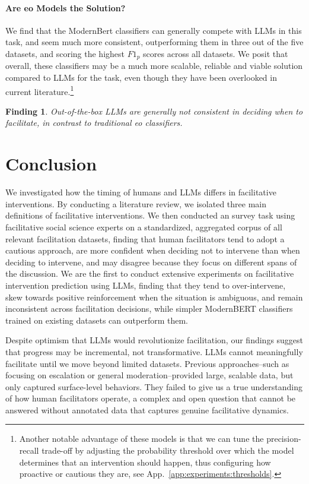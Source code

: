 \documentclass[11pt]{article}
\theoremstyle{definition}
\theoremstyle{plain}
\newtheorem{finding}{Finding}
\begin{document}
\paragraph{Are \ac{eo} Models the Solution?} We find that the ModernBert classifiers can generally compete with LLMs in this task, and seem much more consistent, outperforming them in three out of the five datasets, and scoring the highest $F1_p$ scores across all datasets. We posit that overall, these classifiers may be a much more scalable, reliable and viable solution compared to LLMs for the task, even though they have been overlooked in current literature.\footnote{Another notable advantage of these models is that we can tune the precision-recall trade-off by adjusting the probability threshold over which the model determines that an intervention should happen, thus configuring how proactive or cautious they are, see App.~\ref{app:experiments:thresholds}.}

\begin{finding}
	\label{finding:llms-may-facilitate}
	Out-of-the-box LLMs are generally not consistent in deciding when to facilitate, in contrast to traditional \ac{eo} classifiers.
\end{finding}


\section{Conclusion}
We investigated how the timing of humans and LLMs differs in facilitative interventions. By conducting a literature review, we isolated three main definitions of facilitative interventions. We then conducted an survey task using facilitative social science experts on a standardized, aggregated corpus of all relevant facilitation datasets, finding that human facilitators tend to adopt a cautious approach, are more confident when deciding not to intervene than when deciding to intervene, and may disagree because they focus on different spans of the discussion. We are the first to conduct extensive experiments on facilitative intervention prediction using LLMs, finding that they tend to over-intervene, skew towards positive reinforcement when the situation is ambiguous, and remain inconsistent across facilitation decisions, while simpler ModernBERT classifiers trained on existing datasets can outperform them.

Despite optimism that LLMs would revolutionize facilitation, our findings suggest that progress may be incremental, not transformative. LLMs cannot meaningfully facilitate until we move beyond limited datasets. Previous approaches--such as focusing on escalation or general moderation--provided large, scalable data, but only captured surface-level behaviors. They failed to give us a true understanding of how human facilitators operate, a complex and open question that cannot be answered without annotated data that captures genuine facilitative dynamics.
\end{document}
